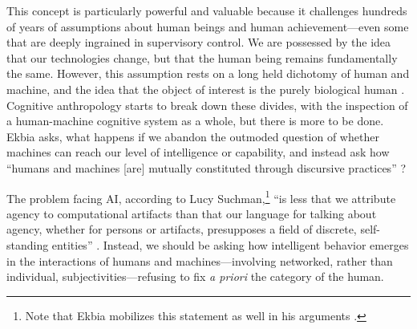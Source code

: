 
This concept is particularly powerful and valuable because it
challenges hundreds of years of assumptions about human beings and
human achievement---even some that are deeply ingrained in supervisory
control. We are
possessed by the idea that our technologies change, but that the human
being remains fundamentally the same. However, this assumption rests on a long held 
dichotomy of human and machine, and the idea that the object of
interest is the purely biological human \cite[p. 327, 331]{ekbia}. Cognitive
anthropology starts to break down these 
divides, with the inspection of a human-machine cognitive system as a
whole, but there is more to be done. Ekbia asks, what happens if we
abandon the outmoded question of whether machines can reach our level
of intelligence or capability, and instead ask how  ``humans and machines
[are] mutually constituted through discursive practices'' \cite[p.
  328]{ekbia}?


The problem facing AI, according to Lucy Suchman,\footnote{Note that
  Ekbia mobilizes this statement as well in his arguments
  \cite[p. 331-332]{ekbia}.} ``is less that we attribute agency to
computational artifacts than that our language for talking about
agency, whether for persons or artifacts, presupposes a field of
discrete, self-standing entities'' \cite[p. 263]{SuchmanPlans}.
Instead, we should be asking how intelligent behavior emerges in
the interactions of
humans and machines---involving networked, rather than individual,
subjectivities---refusing to fix \emph{a priori} the category of 
the human.

